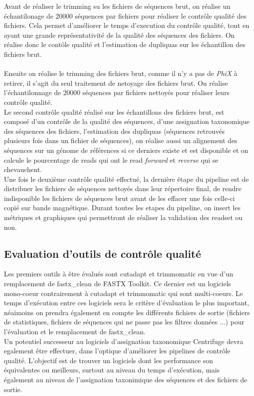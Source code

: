 Avant de réaliser le trimming su les fichiers de séquences brut, on réalise un échantilonage de 20000 séquences par fichiers pour réaliser le contrôle qualité des fichiers. Cela permet d'améliorer le temps d'execution du contrôle qualité, tout en ayant une grande représentativité de la qualité des séquences des fichiers. On réalise donc le contôle qualité et l'estimation de dupliquas sur les échantillon des fichiers brut.\\\\

Ensuite on réalise le trimming des fichiers brut, comme il n'y a pas de \emph{PhiX} à retirer, il s'agit du seul traitement de netoyage des fichiers brut. On réalise l'échantilonnage de 20000 séquences par fichiers nettoyés pour réaliser leurs contrôle qualité.\\

Le second contrôle qualité réalisé sur les échantillons des fichiers brut, est composé d'un contrôle de la qualité des séquences, d'une assignation taxonomique des séquences des fichiers, l'estimation des dupliquas (séquences retrouvés plusieurs fois dans un fichier de séquences), on réalise aussi un alignement des séquences sur un génome de références si ce derniers existe et est disponible et on calcule le pourcentage de reads qui ont le read \emph{forward} et \emph{reverse} qui se chevauchent.\\

Une fois le deuxième contrôle qualité effectué, la dernière étape du pipeline est de distribuer les fichiers de séquences nettoyés dans leur répertoire final, de rendre indisponible les fichiers de séquences brut avant de les effacer une fois celle-ci copié sur bande magnétique. Durant toutes les etapes du pipeline, on insert les métriques et graphiques qui permettront de réaliser la validation des readset ou non.

\subsection{Evaluation d'outils de contrôle qualité}
Les premiers outils à être évalués sont cutadapt et trimmomatic en vue d'un remplacement de fastx\_clean de FASTX Toolkit. Ce dernier est un logiciels mono-coeur contrairement à cutadapt et trimmomatic qui sont multi-coeurs. Le temps d'exécution entre ces logiciels sera le critère d'évaluation le plus important, néaimoins on prendra également en compte les différents fichiers de sortie (fichiers de statistiques, fichiers de séquences qui ne passe pas les filtres données ...) pour l'évaluation et le remplacement de fastx\_clean.\\

Un potentiel successeur au logiciels d'assignation taxonomique Centrifuge devra egalement être effectuer, dans l'optique d'améliorer les pipelines de contrôle qualité. L'objectif est de trouver un logiciels dont les performance son équivalentes ou meilleurs, surtout au niveau du temps d'exécution, mais également au niveau de l'assignation taxonimique des séquences et des fichiers de sortie.